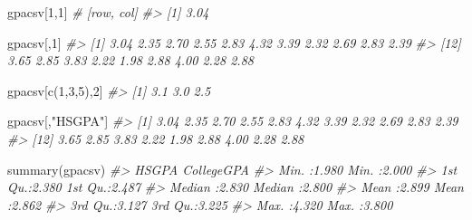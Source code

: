\documentclass[
]{book}
\newenvironment{Shaded}{\begin{snugshade}}{\end{snugshade}}
\newcommand{\CommentTok}[1]{\textcolor[rgb]{0.56,0.35,0.01}{\textit{#1}}}
\newcommand{\DecValTok}[1]{\textcolor[rgb]{0.00,0.00,0.81}{#1}}
\newcommand{\FunctionTok}[1]{\textcolor[rgb]{0.00,0.00,0.00}{#1}}
\newcommand{\NormalTok}[1]{#1}
\newcommand{\StringTok}[1]{\textcolor[rgb]{0.31,0.60,0.02}{#1}}
\begin{document}
\begin{Shaded}
\begin{Highlighting}[]
\NormalTok{gpacsv[}\DecValTok{1}\NormalTok{,}\DecValTok{1}\NormalTok{] }\CommentTok{\# [row, col]}
\CommentTok{\#\textgreater{} [1] 3.04}
\end{Highlighting}
\end{Shaded}

\begin{Shaded}
\begin{Highlighting}[]
\NormalTok{gpacsv[,}\DecValTok{1}\NormalTok{]}
\CommentTok{\#\textgreater{}  [1] 3.04 2.35 2.70 2.55 2.83 4.32 3.39 2.32 2.69 2.83 2.39}
\CommentTok{\#\textgreater{} [12] 3.65 2.85 3.83 2.22 1.98 2.88 4.00 2.28 2.88}
\end{Highlighting}
\end{Shaded}

\begin{Shaded}
\begin{Highlighting}[]
\NormalTok{gpacsv[}\FunctionTok{c}\NormalTok{(}\DecValTok{1}\NormalTok{,}\DecValTok{3}\NormalTok{,}\DecValTok{5}\NormalTok{),}\DecValTok{2}\NormalTok{]}
\CommentTok{\#\textgreater{} [1] 3.1 3.0 2.5}
\end{Highlighting}
\end{Shaded}

\begin{Shaded}
\begin{Highlighting}[]
\NormalTok{gpacsv[,}\StringTok{"HSGPA"}\NormalTok{]}
\CommentTok{\#\textgreater{}  [1] 3.04 2.35 2.70 2.55 2.83 4.32 3.39 2.32 2.69 2.83 2.39}
\CommentTok{\#\textgreater{} [12] 3.65 2.85 3.83 2.22 1.98 2.88 4.00 2.28 2.88}
\end{Highlighting}
\end{Shaded}

\begin{Shaded}
\begin{Highlighting}[]
\FunctionTok{summary}\NormalTok{(gpacsv)}
\CommentTok{\#\textgreater{}      HSGPA         CollegeGPA   }
\CommentTok{\#\textgreater{}  Min.   :1.980   Min.   :2.000  }
\CommentTok{\#\textgreater{}  1st Qu.:2.380   1st Qu.:2.487  }
\CommentTok{\#\textgreater{}  Median :2.830   Median :2.800  }
\CommentTok{\#\textgreater{}  Mean   :2.899   Mean   :2.862  }
\CommentTok{\#\textgreater{}  3rd Qu.:3.127   3rd Qu.:3.225  }
\CommentTok{\#\textgreater{}  Max.   :4.320   Max.   :3.800}
\end{Highlighting}
\end{Shaded}
\end{document}
